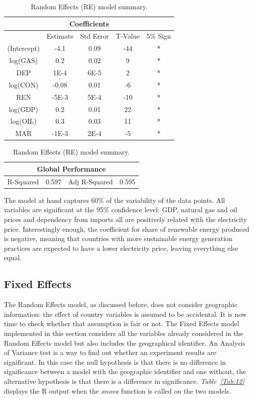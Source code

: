 \documentclass[a4paper,12pt]{book}
\begin{document}
\begin{table}[tb]
\begin{center}
\begin{tabular}{|c|c|c|c|c|}
\hline
\multicolumn{5}{|c|}{Coefficients}\\
\hline
&Estimate&Std Error&T-Value&5\% Sign\\
\hline
(Intercept)&-4.1&0.09&-44&*\\
log(GAS)&0.2&0.02&9&*\\
DEP&1E-4&6E-5&2&*\\
log(CON)&-0.08&0.01&-6&*\\
REN&-5E-3&5E-4&-10&*\\
log(GDP)&0.2&0.01&22&*\\
log(OIL)&0.3&0.03&11&*\\
MAR&-1E-3&2E-4&-5&*\\
\hline
\end{tabular}
\end{center}
\begin{center}
\begin{tabular}{|c|c|c|c|}
\hline
\multicolumn{4}{|c|}{Global Performance}\\
\hline
R-Squared&0.597&Adj R-Squared&0.595\\
\hline
\end{tabular}
\caption{Random Effects (RE) model summary.}
\label{Tab:re}
\end{center}
\end{table}

The model at hand captures 60\% of the variability of the data points. All variables are significant at the 95\% confidence level: GDP, natural gas and oil prices and dependency from imports all are positively related with the electricity price. Interestingly enough, the coefficient for share of renewable energy produced is negative, meaning that countries with more sustainable energy generation practices are expected to have a lower electricity price, leaving everything else equal.

\subsection{Fixed Effects}

The Random Effects model, as discussed before, does not consider geographic information: the effect of country variables is assumed to be accidental. It is now time to check whether that assumption is fair or not. The Fixed Effects model implemented in this section considers all the variables already considered in the Random Effects model but also includes the geographical identifier. An Analysis of Variance test is a way to find out whether an experiment results are significant. In this case the null hypothesis is that there is no difference in significance between a model with the geographic identifier and one without, the alternative hypothesis is that there is a difference in significance. \textit{Table~\ref{Tab:12}} displays the R output when the \textit{anova} function is called on the two models.
\end{document}
